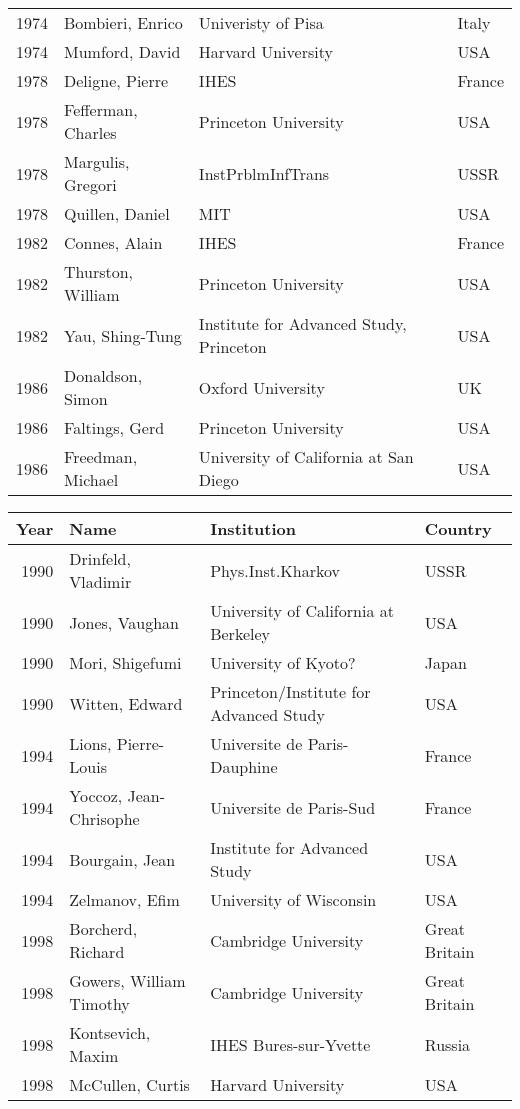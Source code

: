 \begin{tabular}{|r|l|l|l|}
1974&Bombieri, Enrico    &Univeristy of Pisa         &Italy \\
1974&Mumford, David      &Harvard University         &USA \\
1978&Deligne, Pierre     &IHES                       &France \\
1978&Fefferman, Charles  &Princeton University       &USA \\
1978&Margulis, Gregori   &InstPrblmInfTrans          &USSR \\
1978&Quillen, Daniel     &MIT                        &USA \\
1982&Connes, Alain       &IHES                       &France \\
1982&Thurston, William   &Princeton University       &USA \\
1982&Yau, Shing-Tung     &Institute for Advanced Study, Princeton&USA \\
1986&Donaldson, Simon    &Oxford University          &UK \\
1986&Faltings, Gerd      &Princeton University       &USA \\
1986&Freedman, Michael   &University of California at San Diego&USA \\
\hline
\end{tabular}

\begin{tabular}{|r|l|l|l|} \hline

{Year} & {Name} & {Institution} &{Country}\\
\hline

1990&Drinfeld, Vladimir  &Phys.Inst.Kharkov          &USSR \\
1990&Jones, Vaughan      &University of California at Berkeley&USA \\
1990&Mori, Shigefumi     &University of Kyoto?       &Japan \\
1990&Witten, Edward      &Princeton/Institute for Advanced Study&USA \\
1994&Lions, Pierre-Louis &Universite de Paris-Dauphine&France\\
1994&Yoccoz, Jean-Chrisophe&Universite de Paris-Sud  &France\\
1994&Bourgain, Jean      &Institute for Advanced Study&USA\\
1994&Zelmanov, Efim      &University of Wisconsin    &USA\\
1998&Borcherd, Richard   &Cambridge University       &Great Britain \\
1998&Gowers, William Timothy&Cambridge University    &Great Britain\\
1998&Kontsevich, Maxim   &IHES Bures-sur-Yvette      &Russia\\
1998&McCullen, Curtis    &Harvard University         &USA\\
\hline
\end{tabular}

